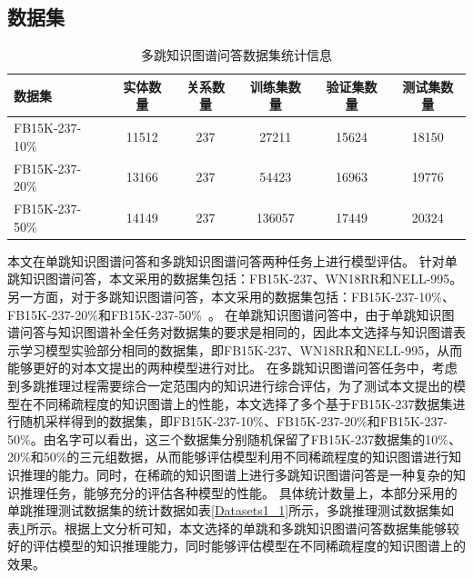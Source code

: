 \documentclass[algorithmlist, AutoFakeBold, AutoFakeSlant, figurelist, tablelist, nomlist, engineering]{seuthesix}
\begin{document}
\subsection{数据集}
\begin{table}[t]
  \centering
  \caption{多跳知识图谱问答数据集统计信息}
  \begin{tabular*}{0.95\textwidth}{@{\extracolsep{\fill}}lccccc}
		\toprule[1pt]
    数据集 & 实体数量 & 关系数量 & 训练集数量 & 验证集数量 & 测试集数量 \\ \hline
    FB15K-237-10\% & 11512 & 237 & 27211 & 15624 & 18150\\
    FB15K-237-20\% & 13166 & 237 & 54423 & 16963 & 19776\\
    FB15K-237-50\% & 14149 & 237 & 136057 & 17449 & 20324\\
		\bottomrule[1pt]
	\end{tabular*}
  \label{Datasets2}
\end{table}
本文在单跳知识图谱问答和多跳知识图谱问答两种任务上进行模型评估。
针对单跳知识图谱问答，本文采用的数据集包括：FB15K-237、WN18RR和NELL-995。
另一方面，对于多跳知识图谱问答，本文采用的数据集包括：FB15K-237-10\%、FB15K-237-20\%和FB15K-237-50\%~\cite{lv2020dynamic}。
在单跳知识图谱问答中，由于单跳知识图谱问答与知识图谱补全任务对数据集的要求是相同的，因此本文选择与知识图谱表示学习模型实验部分相同的数据集，即FB15K-237、WN18RR和NELL-995，从而能够更好的对本文提出的两种模型进行对比。
在多跳知识图谱问答任务中，考虑到多跳推理过程需要综合一定范围内的知识进行综合评估，为了测试本文提出的模型在不同稀疏程度的知识图谱上的性能，本文选择了多个基于FB15K-237数据集进行随机采样得到的数据集，即FB15K-237-10\%、FB15K-237-20\%和FB15K-237-50\%。由名字可以看出，这三个数据集分别随机保留了FB15K-237数据集的10\%、20\%和50\%的三元组数据，从而能够评估模型利用不同稀疏程度的知识图谱进行知识推理的能力。同时，在稀疏的知识图谱上进行多跳知识图谱问答是一种复杂的知识推理任务，能够充分的评估各种模型的性能。
具体统计数量上，本部分采用的单跳推理测试数据集的统计数据如表\ref{Datasets1_1}所示，多跳推理测试数据集如表\ref{Datasets2}所示。根据上文分析可知，本文选择的单跳和多跳知识图谱问答数据集能够较好的评估模型的知识推理能力，同时能够评估模型在不同稀疏程度的知识图谱上的效果。
\end{document}
